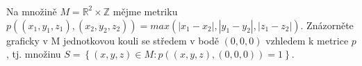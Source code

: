 \subsubsection{}
Na množině $M=\mathbb{R}^{2}\times \mathbb{Z}$ mějme metriku
$p((x_{1},y_{1},z_{1}), (x_{2},y_{2},z_{2}))=max(|x_{1}-x_{2}|, |y_{1}-y_{2}|,
|z_{1}-z_{2}|)$. Znázorněte graficky v M jednotkovou kouli se středem v bodě
$(0,0,0)$ vzhledem k metrice $p$, tj. množinu $S=\left \{ (x,y,z) \in M
:p((x,y,z),(0,0,0))=1\right \}$.
